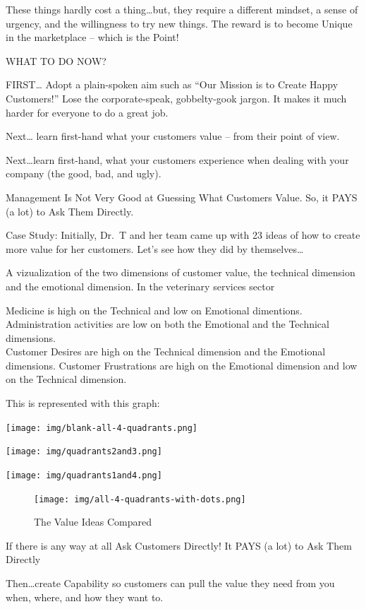 \documentclass[
]{book}
\begin{document}
These things hardly cost a thing\ldots but, they require a different mindset, a sense of urgency, and the willingness to try new things.
The reward is to become Unique in the marketplace -- which is the Point!

WHAT TO DO NOW?

FIRST\ldots{} Adopt a plain-spoken aim such as ``Our Mission is to Create Happy Customers!'' Lose the corporate-speak, gobbelty-gook jargon. It makes it much harder for everyone to do a great job.

Next\ldots{} learn first-hand what your customers value -- from their point of view.

Next\ldots learn first-hand, what your customers experience when dealing with your company (the good, bad, and ugly).

Management Is Not Very Good at Guessing What Customers Value. So, it PAYS (a lot) to Ask Them Directly.

Case Study: Initially, Dr.~T and her team came up with 23 ideas of how to create more value for her customers. Let's see how they did by themselves\ldots{}

A vizualization of the two dimensions of customer value, the technical dimension and the emotional dimension. In the veterinary services sector

Medicine is high on the Technical and low on Emotional dimentions.
Administration activities are low on both the Emotional and the Technical dimensions.\\
Customer Desires are high on the Technical dimension and the Emotional dimensions.
Customer Frustrations are high on the Emotional dimension and low on the Technical dimension.

This is represented with this graph:

\texttt{[image: img/blank-all-4-quadrants.png]}

\texttt{[image: img/quadrants2and3.png]}

\texttt{[image: img/quadrants1and4.png]}

\begin{figure}
\centering
\texttt{[image: img/all-4-quadrants-with-dots.png]}
\caption{The Value Ideas Compared}
\end{figure}

If there is any way at all Ask Customers Directly! It PAYS (a lot) to Ask Them Directly

Then\ldots create Capability so customers can pull the value they need from you when, where, and how they want to.
\end{document}
